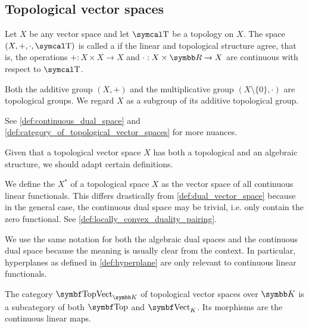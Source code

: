 \subsection{Topological vector spaces}\label{subsec:topological_vector_spaces}

\begin{definition}\label{def:topological_vector_space}
  Let \( X \) be any vector space and let \( \T \) be a topology on \( X \). The space \( (X, +, \cdot, \T) \) is called a  if the linear and topological structure agree, that is, the operations \( +: X \times X \to X \) and \( \cdot: X \times \R \to X \) are continuous with respect to \( \T \).

  Both the additive group \( (X, +) \) and the multiplicative group \( (X \setminus \{ 0 \}, \cdot) \) are topological groups. We regard \( X \) as a subgroup of its additive topological group.

  See \cref{def:continuous_dual_space} and \cref{def:category_of_topological_vector_spaces} for more nuances.
\end{definition}

Given that a topological vector space \( X \) has both a topological and an algebraic structure, we should adapt certain definitions.

\begin{definition}\label{def:continuous_dual_space}
  We define the  \( X^* \) of a topological space \( X \) as the vector space of all continuous linear functionals. This differs drastically from \cref{def:dual_vector_space} because in the general case, the continuous dual space may be trivial, i.e. only contain the zero functional. See \cref{def:locally_convex_duality_pairing}.

  We use the same notation for both the algebraic dual spaces and the continuous dual space because the meaning is usually clear from the context. In particular, hyperplanes as defined in \cref{def:hyperplane} are only relevant to continuous linear functionals.
\end{definition}

\begin{definition}\label{def:category_of_topological_vector_spaces}
  The category \( \Cat{TopVect}_{\K} \) of topological vector spaces over \( \K \) is a subcategory of both \( \Cat{Top} \) and \( \Cat{Vect}_K \). Its morphisms are the continuous linear maps.
\end{definition}

